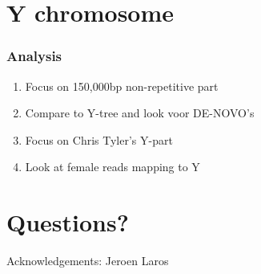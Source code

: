 \documentclass[slidestop,14pt]{beamer}
\begin{document}
\section{Y chromosome}


\begin{frame}
  \frametitle{Analysis}

  \vspace{\baselineskip}

  \begin{enumerate}
    \item Focus on 150,000bp non-repetitive part
    \item Compare to Y-tree and look voor DE-NOVO's
    \item Focus on Chris Tyler's Y-part
    \item Look at female reads mapping to Y
  \end{enumerate}
\end{frame}

\section{Questions?}


\lastpagetemplate
\begin{frame}
  \begin{center}
    Acknowledgements:
    \bigskip
    \bigskip
    Jeroen Laros
  \end{center}
\end{frame}
\end{document}
